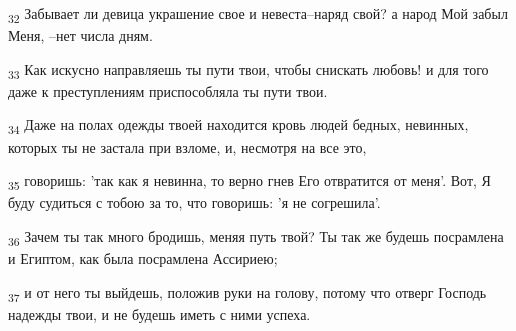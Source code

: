 \begin{tcolorbox}
\textsubscript{32} Забывает ли девица украшение свое и невеста--наряд свой? а народ Мой забыл Меня, --нет числа дням.
\end{tcolorbox}
\begin{tcolorbox}
\textsubscript{33} Как искусно направляешь ты пути твои, чтобы снискать любовь! и для того даже к преступлениям приспособляла ты пути твои.
\end{tcolorbox}
\begin{tcolorbox}
\textsubscript{34} Даже на полах одежды твоей находится кровь людей бедных, невинных, которых ты не застала при взломе, и, несмотря на все это,
\end{tcolorbox}
\begin{tcolorbox}
\textsubscript{35} говоришь: 'так как я невинна, то верно гнев Его отвратится от меня'. Вот, Я буду судиться с тобою за то, что говоришь: 'я не согрешила'.
\end{tcolorbox}
\begin{tcolorbox}
\textsubscript{36} Зачем ты так много бродишь, меняя путь твой? Ты так же будешь посрамлена и Египтом, как была посрамлена Ассириею;
\end{tcolorbox}
\begin{tcolorbox}
\textsubscript{37} и от него ты выйдешь, положив руки на голову, потому что отверг Господь надежды твои, и не будешь иметь с ними успеха.
\end{tcolorbox}
